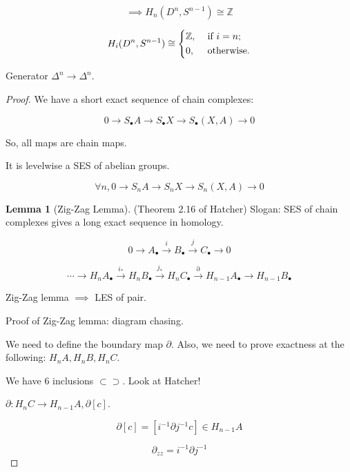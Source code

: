 \documentclass{article}
\theoremstyle{definition}
\newtheorem{lemma}[theorem]{Lemma}
\begin{document}
    \[
        \implies H_n(D^n, S^{n-1}) \cong \mathbb{Z}
    \]

    \[
        H_i(D^n,S^{n-1}) \cong \begin{dcases}
            \mathbb{Z}, &\text{ if } i = n ;\\
            0, &\text{ otherwise} .
        \end{dcases}
    \]

    Generator \(\Delta^n \to \Delta^n\).

    \begin{proof}
        We have a short exact sequence of chain complexes:

        \[
            0 \to S_\bullet A \to S_\bullet X \to S_\bullet (X,A) \to 0
        \]

        So, all maps are chain maps.

        It is levelwise a SES of abelian groups.

        \[
            \forall n, 0 \to S_n A \to S_n X \to S_n(X,A) \to 0
        \]

        \begin{lemma}
            [Zig-Zag Lemma] (Theorem 2.16 of Hatcher) Slogan: SES of chain complexes gives a long exact sequence in homology.

            \[
                0 \to A_\bullet \xrightarrow{i} B_\bullet \xrightarrow{j} C_\bullet \to 0
            \]

            \[
                \cdots \to H_n A_\bullet \xrightarrow{i_{\ast}} H_n B_\bullet \xrightarrow{j_{\ast}} H_n C_\bullet \xrightarrow{\partial} H_{n-1} A_\bullet \to H_{n-1} B_\bullet
            \]
        \end{lemma}

        Zig-Zag lemma \(\implies\) LES of pair.

        Proof of Zig-Zag lemma: diagram chasing.

        We need to define the boundary map \(\partial \). Also, we need to prove exactness at the following: \(H_n A, H_n B, H_n C\). 

        We have \(6\) inclusions \(\subset \supset\). Look at Hatcher!

        \(\partial : H_n C \to H_{n-1} A, \partial [c]\).

        \begin{center}
        \end{center}

        \[
            \partial [c] = [i ^{-1} \partial j ^{-1} c] \in H_{n-1} A
        \]

        \[
            \partial_{zz} = i ^{-1} \partial j ^{-1}
        \]
    \end{proof}
\end{document}
